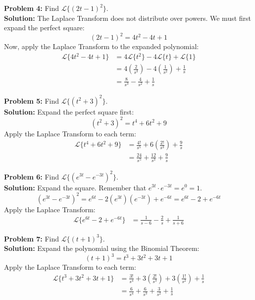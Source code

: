 \documentclass[11pt, letterpaper]{article}
\theoremstyle{definition}
\theoremstyle{remark}
\begin{document}
\vspace{1em}
\textbf{Problem 4:} Find $\mathscr{L}\{(2t - 1)^2\}$.
\vspace{0.5em} \\
\textbf{Solution:} The Laplace Transform does not distribute over powers. We must first expand the perfect square:
\[
(2t - 1)^2 = 4t^2 - 4t + 1
\]
Now, apply the Laplace Transform to the expanded polynomial:
\begin{align*}
    \mathscr{L}\{4t^2 - 4t + 1\} &= 4\mathscr{L}\{t^2\} - 4\mathscr{L}\{t\} + \mathscr{L}\{1\} \\[4pt]
    &= 4\left(\frac{2}{s^3}\right) - 4\left(\frac{1}{s^2}\right) + \frac{1}{s} \\[4pt]
    &= \frac{8}{s^3} - \frac{4}{s^2} + \frac{1}{s}
\end{align*}

\vspace{1em}
\textbf{Problem 5:} Find $\mathscr{L}\{(t^2 + 3)^2\}$.
\vspace{0.5em} \\
\textbf{Solution:} Expand the perfect square first:
\[
(t^2 + 3)^2 = t^4 + 6t^2 + 9
\]
Apply the Laplace Transform to each term:
\begin{align*}
    \mathscr{L}\{t^4 + 6t^2 + 9\} &= \frac{4!}{s^5} + 6\left(\frac{2!}{s^3}\right) + \frac{9}{s} \\[4pt]
    &= \frac{24}{s^5} + \frac{12}{s^3} + \frac{9}{s}
\end{align*}

\vspace{1em}
\textbf{Problem 6:} Find $\mathscr{L}\{(e^{3t} - e^{-3t})^2\}$.
\vspace{0.5em} \\
\textbf{Solution:} Expand the square. Remember that $e^{3t} \cdot e^{-3t} = e^0 = 1$.
\[
(e^{3t} - e^{-3t})^2 = e^{6t} - 2(e^{3t})(e^{-3t}) + e^{-6t} = e^{6t} - 2 + e^{-6t}
\]
Apply the Laplace Transform:
\begin{align*}
    \mathscr{L}\{e^{6t} - 2 + e^{-6t}\} &= \frac{1}{s - 6} - \frac{2}{s} + \frac{1}{s + 6}
\end{align*}

\vspace{1em}
\textbf{Problem 7:} Find $\mathscr{L}\{(t+1)^3\}$.
\vspace{0.5em} \\
\textbf{Solution:} Expand the polynomial using the Binomial Theorem:
\[
(t+1)^3 = t^3 + 3t^2 + 3t + 1
\]
Apply the Laplace Transform to each term:
\begin{align*}
    \mathscr{L}\{t^3 + 3t^2 + 3t + 1\} &= \frac{3!}{s^4} + 3\left(\frac{2!}{s^3}\right) + 3\left(\frac{1!}{s^2}\right) + \frac{1}{s} \\[4pt]
    &= \frac{6}{s^4} + \frac{6}{s^3} + \frac{3}{s^2} + \frac{1}{s}
\end{align*}
\end{document}
